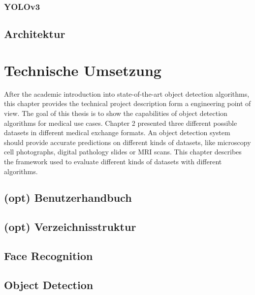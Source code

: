 \documentclass[12pt,ngerman,a4paper,oneside,,tablecaptionabove]{scrbook}
\begin{document}
\hypertarget{yolov3}{%
\subsection{YOLOv3}\label{yolov3}}

\hypertarget{sec:Architektur}{%
\section{Architektur}\label{sec:Architektur}}

\hypertarget{sec:TechnischeUmsetzung}{%
\chapter{Technische Umsetzung}\label{sec:TechnischeUmsetzung}}

After the academic introduction into state-of-the-art object detection
algorithms, this chapter provides the technical project description form
a engineering point of view. The goal of this thesis is to show the
capabilities of object detection algorithms for medical use cases.
Chapter 2 presented three different possible datasets in different
medical exchange formats. An object detection system should provide
accurate predictions on different kinds of datasets, like microscopy
cell photographs, digital pathology slides or MRI scans. This chapter
describes the framework used to evaluate different kinds of datasets
with different algorithms.

\hypertarget{opt-benutzerhandbuch}{%
\section{(opt) Benutzerhandbuch}\label{opt-benutzerhandbuch}}

\hypertarget{opt-verzeichnisstruktur}{%
\section{(opt) Verzeichnisstruktur}\label{opt-verzeichnisstruktur}}

\hypertarget{sec:TechnischeUmsetzungFR}{%
\section{Face Recognition}\label{sec:TechnischeUmsetzungFR}}

\hypertarget{sec:TechnischeUmsetzungOD}{%
\section{Object Detection}\label{sec:TechnischeUmsetzungOD}}
\end{document}
